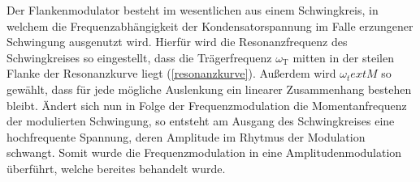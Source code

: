 Der Flankenmodulator besteht im wesentlichen aus einem Schwingkreis, in welchem die Frequenzabhängigkeit der Kondensatorspannung im Falle erzungener Schwingung ausgenutzt wird. Hierfür wird die Resonanzfrequenz des Schwingkreises so eingestellt, dass die Trägerfrequenz $\omega_\text{T}$ mitten in der steilen Flanke der Resonanzkurve liegt (\autoref{resonanzkurve}). Außerdem wird $\omega_text{M}$ so gewählt, dass für jede mögliche Auslenkung ein linearer Zusammenhang bestehen bleibt. Ändert sich nun in Folge der Frequenzmodulation die Momentanfrequenz der modulierten Schwingung, so entsteht am Ausgang des Schwingkreises eine hochfrequente Spannung, deren Amplitude im Rhytmus der Modulation schwangt. Somit wurde die Frequenzmodulation in eine Amplitudenmodulation überführt, welche bereites behandelt wurde.
